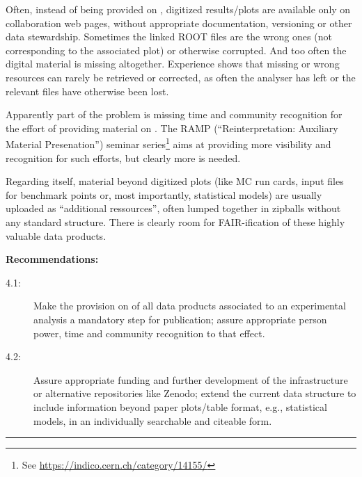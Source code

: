 \documentclass[11pt]{article}
\begin{document}
Often, instead of being provided on \hepdata, digitized results/plots are available only on collaboration web pages, without appropriate documentation, versioning or other data stewardship. Sometimes the linked ROOT files are the wrong ones (not corresponding to the associated plot) or otherwise corrupted. And too often the digital material is missing altogether. Experience shows that missing or wrong resources can rarely be retrieved or corrected, as often the analyser has left or the relevant files have otherwise been lost. 

Apparently part of the problem is missing time and community recognition for the effort of providing material on \hepdata. The RAMP (``Reinterpretation: Auxiliary Material Presenation'') seminar series\footnote{See \url{https://indico.cern.ch/category/14155/}}  aims at providing more visibility and recognition for such efforts, but clearly more is needed.

Regarding \hepdata itself, material beyond digitized plots (like MC run cards, input files for benchmark points or, most importantly, statistical models) are usually uploaded as ``additional ressources'', often lumped together in zipballs without any standard structure.   
There is clearly room for FAIR-ification of these highly valuable data products. 

\noindent
\textbf{Recommendations:}
\begin{description}
   \item[4.1:] Make the provision on \hepdata of all data products associated to an experimental analysis a mandatory step for publication; assure appropriate person power, time and community recognition to that effect. 
   \item[4.2:] Assure appropriate funding and further development of the \hepdata infrastructure or alternative repositories like Zenodo; extend the current data structure to include information beyond paper plots/table format, e.g., statistical models, in an individually searchable and citeable form.
\end{description}

\hrule 


\end{document}

